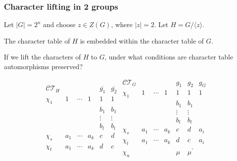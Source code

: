 \documentclass[xcolor=dvipsnames]{beamer}
\theoremstyle{remark}
\theoremstyle{plain}
\theoremstyle{definition}
\begin{document}
\begin{frame}
\frametitle{Character lifting in 2 groups}
Let $|G|=2^n$ and choose $z\in Z(G)$, where $|z|=2$. Let $H=G/\langle
z\rangle$.\pause\vspace{.3cm}

The character table of $H$ is embedded within the character table of
$G$.\pause\vspace{.3cm}


If we lift the characters of $H$ to $G$, under what conditions are
character table automorphisms preserved?\vspace{.3cm}

\[
\begin{array}{ccccccc}
  \mathcal{CT}_H       &   &        &       & \overline{g_1} & \overline{g_2}\\
  \chi_1 & 1 & \cdots &   1 & 1              & 1\\
         &   &   &             & b_1            & b_1\\
         &   &   &             & \vdots         & \vdots\\
         &   &   &             & b_l            & b_l\\
  \chi_s & a_1 &\cdots & a_k & c & d\\
  \chi_t & a_1 &\cdots & a_k & d & c\\
\end{array}
\begin{array}{|ccccccc}
  \mathcal{CT}_G         &   &       &       & g_1 & g_2 & g_G\\
  \chi_1 & 1 & \cdots  & 1 & 1              & 1 & 1\\
         &   &   &             & b_1            & b_1 &\\
         &   &   &             & \vdots         & \vdots&\\
         &   &   &             & b_l            & b_l&\\
  \chi_s & a_1 &\cdots  & a_k & c & d &a_i\\
  \chi_t & a_1 &\cdots  & a_k & d & c &a_i\\
  \chi_u &     &        &    & \mu & \mu^{\prime} &\\ 
\end{array}
\]

\end{frame}
\end{document}

